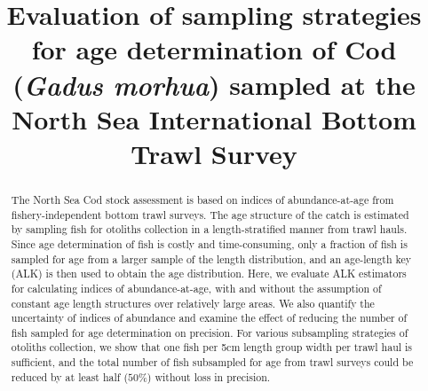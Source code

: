 \documentclass[a4paper 12pt]{article}
\title{\bf 
}
\author{}
\date{}
\numberwithin{equation}{section}
\begin{document}

\title{Evaluation of sampling strategies for age determination of Cod (\textit{Gadus morhua}) sampled at the  North Sea International Bottom Trawl Survey }
\maketitle


\begin{abstract}

The North Sea Cod stock assessment is based on indices of abundance-at-age from fishery-independent bottom trawl surveys. The age structure of the catch is estimated by sampling fish for otoliths collection in a length-stratified manner from trawl hauls. Since age determination of fish is costly and time-consuming, only a fraction of fish is sampled for age from a larger sample of the length distribution, and an age-length key (ALK) is then used to obtain the age distribution. Here, we evaluate ALK estimators for calculating indices of abundance-at-age, with and without the assumption of constant age length structures over relatively large areas. We also quantify the uncertainty of indices of  abundance and examine the effect of reducing the number of fish sampled for age determination on precision. For various subsampling strategies of otoliths collection, we show that  one fish per 5cm length group width per trawl haul is sufficient, and the total number of fish subsampled for age from trawl surveys could be reduced by at least half ($50\%$) without loss in precision.

\end{abstract}

\end{document}
